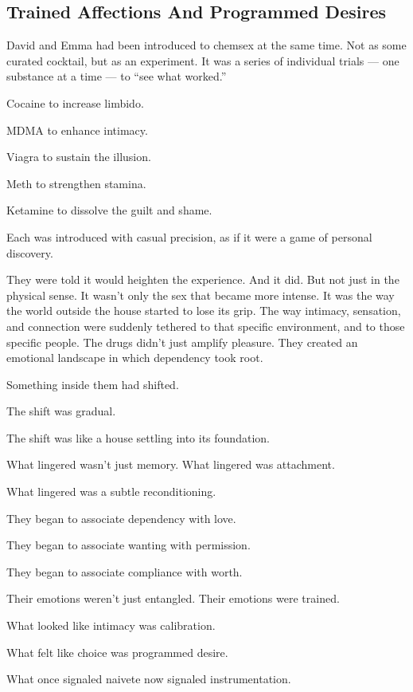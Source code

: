 \medskip


\subsection{Trained Affections And Programmed Desires}


David and Emma had been introduced to chemsex at the same time. Not as some curated cocktail, but as an experiment. 
It was a series of individual trials --- one substance at a time --- to ``see what worked.'' 

Cocaine to increase limbido. 

MDMA to enhance intimacy. 

Viagra to sustain the illusion. 

Meth to strengthen stamina. 

Ketamine to dissolve the guilt and shame. 

Each was introduced with casual precision, as if it were a game of personal discovery.

They were told it would heighten the experience. And it did. But not just in the physical sense. It wasn’t only 
the sex that became more intense. It was the way the world outside the house started to lose its grip. 
The way intimacy, sensation, and connection were suddenly tethered to that specific environment, and to those 
specific people. The drugs didn’t just amplify pleasure. They created an emotional landscape in which 
dependency took root.

Something inside them had shifted. 

The shift was gradual. 

The shift was like a house settling into its foundation. 

What lingered wasn’t just memory. 
What lingered was attachment. 

What lingered was a subtle reconditioning. 

They began to associate dependency with love. 

They began to associate wanting with permission.

They began to associate compliance with worth.

Their emotions weren’t just entangled. 
Their emotions were trained.

What looked like intimacy was calibration.

What felt like choice was programmed desire.

What once signaled naivete now signaled instrumentation.

